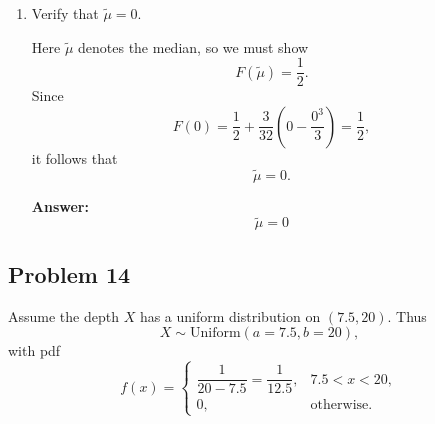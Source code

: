 \documentclass[11pt]{article}
\begin{document}
\begin{enumerate}
    \textbf{Answer:}
    \[
    \boxed{F'(x)=\frac{3}{32}(4-x^2)\text{ on }(-2,2),\text{ so this matches Exercise 3.}}
    \]

    \item[(e)] Verify that \(\tilde{\mu}=0\).

    Here \(\tilde{\mu}\) denotes the median, so we must show
    \[
    F(\tilde{\mu})=\frac12.
    \]
    Since
    \[
    F(0)=\frac12+\frac{3}{32}\left(0-\frac{0^3}{3}\right)=\frac12,
    \]
    it follows that
    \[
    \tilde{\mu}=0.
    \]

    \textbf{Answer:}
    \[
    \boxed{\tilde{\mu}=0}
    \]
\end{enumerate}

\subsection*{Problem 14}

Assume the depth \(X\) has a uniform distribution on \((7.5,20)\). Thus
\[
X\sim \mathrm{Uniform}(a=7.5,b=20),
\]
with pdf
\[
f(x)=
\begin{cases}
\dfrac{1}{20-7.5}=\dfrac{1}{12.5}, & 7.5<x<20,\\[6pt]
0, & \text{otherwise.}
\end{cases}
\]
\end{document}

